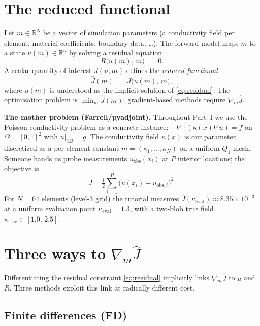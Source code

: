 \documentclass[11pt]{article}
\newcommand{\RR}{\mathbb{R}}
\begin{document}
\section{The reduced functional}
\label{sec:reduced}

Let $m \in \RR^N$ be a vector of simulation parameters (a conductivity
field per element, material coefficients, boundary data, \ldots).  The
forward model maps $m$ to a state $u(m) \in \RR^n$ by solving a residual
equation
\begin{equation}
  R\bigl(u(m),\, m\bigr) \;=\; 0 .
  \label{eq:residual}
\end{equation}
A scalar quantity of interest $J(u, m)$ defines the \emph{reduced
functional}
\begin{equation}
  \hat{J}(m) \;=\; J\!\bigl(u(m),\, m\bigr),
  \label{eq:Jhat}
\end{equation}
where $u(m)$ is understood as the implicit solution of \eqref{eq:residual}.
The optimisation problem is $\min_m \hat{J}(m)$; gradient-based methods
require $\nabla_m \hat{J}$.

\textbf{The mother problem (Farrell/pyadjoint).}  Throughout Part~I we
use the Poisson conductivity problem as a concrete instance:
$-\nabla\cdot(\kappa(x)\nabla u) = f$ on $\Omega = [0,1]^2$ with
$u|_{\partial\Omega} = g$.  The conductivity field $\kappa(x)$ is our
parameter, discretized as a per-element constant $m = (\kappa_1,\ldots,
\kappa_N)$ on a uniform $Q_1$ mesh.  Someone hands us probe measurements
$u_{\mathrm{obs}}(x_i)$ at $P$ interior locations; the objective is
\begin{equation}
  J = \tfrac12 \sum_{i=1}^P \bigl(u(x_i) - u_{\mathrm{obs},i}\bigr)^2 .
  \label{eq:Jprobe}
\end{equation}
For $N = 64$ elements (level-3 grid) the tutorial measures
$\hat{J}(\kappa_{\mathrm{eval}}) \approx 8.35 \times 10^{-3}$ at a
uniform evaluation point $\kappa_{\mathrm{eval}} = 1.3$, with a two-blob
true field $\kappa_{\mathrm{true}} \in [1.0,\, 2.5]$.

\section{Three ways to $\nabla_m \hat{J}$}
\label{sec:threeways}

Differentiating the residual constraint \eqref{eq:residual}
implicitly links $\nabla_m \hat{J}$ to $u$ and $R$.  Three methods
exploit this link at radically different cost.

\subsection{Finite differences (FD)}
\end{document}
